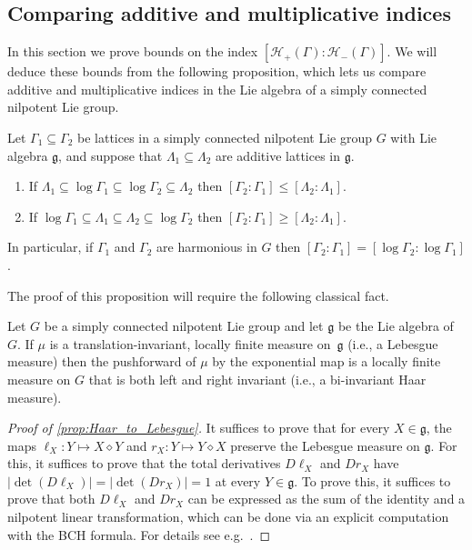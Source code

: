 %
%
%

%
%
%

\subsection{Comparing additive and multiplicative indices}

In this section we prove bounds on the index $[\mathscr{H}_+(\Gamma):\mathscr{H}_-(\Gamma)]$. We will deduce these bounds from the following proposition, which lets us compare additive and multiplicative indices in the Lie algebra of a simply connected nilpotent Lie group.


\begin{proposition}
\label{prop:harmonious_indices}
Let $\Gamma_1 \subseteq \Gamma_2$ be lattices in a simply connected nilpotent Lie group $G$ with Lie algebra $\mathfrak{g}$, and suppose that $\Lambda_1\subseteq \Lambda_2$ are additive lattices in $\mathfrak{g}$.
\begin{enumerate}
\item If $\Lambda_1 \subseteq \log \Gamma_1 \subseteq \log \Gamma_2 \subseteq \Lambda_2$ then $[\Gamma_2:\Gamma_1] \leq [\Lambda_2:\Lambda_1]$. 
\item If  $\log \Gamma_1 \subseteq \Lambda_1  \subseteq \Lambda_2 \subseteq \log \Gamma_2$ then $[\Gamma_2:\Gamma_1] \geq [\Lambda_2:\Lambda_1]$. 
\end{enumerate}
In particular, if $\Gamma_1$ and $\Gamma_2$ are harmonious in $G$ then $[\Gamma_2:\Gamma_1]=[\log \Gamma_2:\log \Gamma_1]$.
\end{proposition}

The proof of this proposition will require the following classical fact.

\begin{proposition}
\label{prop:Haar_to_Lebesgue}
Let $G$ be a simply connected nilpotent Lie group and let $\mathfrak{g}$ be the Lie algebra of $G$. If $\mu$ is a translation-invariant, locally finite measure on~$\mathfrak{g}$ (i.e., a Lebesgue measure) then the pushforward of $\mu$ by the exponential map is a locally finite measure on $G$ that is both left and right invariant (i.e., a bi-invariant Haar measure).
\end{proposition}

\begin{proof}[Proof of \cref{prop:Haar_to_Lebesgue}]
It suffices to prove that for every $X\in \mathfrak{g}$, the maps $\ell_X:Y \mapsto X \diamond Y$ and $r_X:Y \mapsto Y \diamond X$ preserve the Lebesgue measure on $\mathfrak{g}$. For this, it suffices to prove that the total derivatives $D\ell_X$ and $Dr_X$ have $|\det(D\ell_X)|=|\det(Dr_X)|=1$ at every $Y\in \mathfrak{g}$. To prove this, it suffices to prove that both $D\ell_X$ and $Dr_X$ can be expressed as the sum of the identity and a nilpotent linear transformation, which can be done via an explicit computation with the BCH formula. For details see e.g.\ \cite[Proposition 2.1.1]{Wang2023}.
\end{proof}

